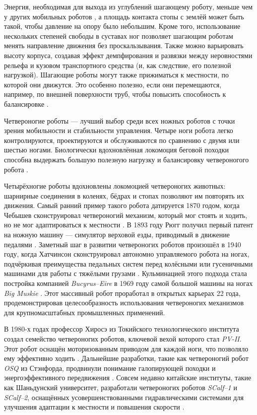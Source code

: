 Энергия, необходимая для выхода из углублений шагающему роботу, меньше чем у других мобильных роботов \cite{Bekker1962, bekker1969}, а площадь контакта стопы с землёй может быть такой, чтобы давление на опору было небольшим. Кроме того, использование нескольких степеней свободы в суставах ног позволяет шагающим роботам менять направление движения без проскальзывания. Также можно варьировать высоту корпуса, создавая эффект демпфирования и развязки между неровностями рельефа и кузовом транспортного средства (и, как следствие, его полезной нагрузкой). Шагающие роботы могут также прижиматься к местности, по которой они движутся. Это особенно полезно, если они перемещаются, например, по внешней поверхности труб, чтобы повысить способность к балансировке \cite{Kaneko2002}.

Четвероногие роботы --- лучший выбор среди всех ножных роботов с точки зрения мобильности и стабильности управления. Четыре ноги робота легко контролируются, проектируются и обслуживаются по сравнению с двумя или шестью ногами. Биологически вдохновлённая локомоция беговой походки способна выдержать большую полезную нагрузку и балансировку четвероногого робота \cite{gonccalves2013}.

Четырёхногие роботы вдохновлены локомоцией четвероногих животных: шарнирные соединения в коленях, бёдрах и стопах позволяют им повторять их движения. Самый ранний пример такого робота датируется 1870 годом, когда Чебышев сконструировал четвероногий механизм, который мог стоять и ходить, но не мог адаптироваться к местности \cite{Cheb1948}. В 1893 году Рюгг получил первый патент на ножную машину --- симулятор верховой езды, приводимый в движение педалями \cite{patent}. Заметный шаг в развитии четвероногих роботов произошёл в 1940 году, когда Хатчинсон сконструировал автономно управляемого робота на ногах, подчёркивая преимущества педальных систем перед колёсными или гусеничными машинами для работы с тяжёлыми грузами \cite{Hutchinson1967}.  Кульминацией этого подхода стала постройка компанией \textit{Bucyrus--Eire} в 1969 году самой большой машины на ногах \textit{Big Muskie} \cite{haddock2001extreme}. Этот массивный робот проработал в открытых карьерах 22 года, продемонстрировав целесообразность использования четвероногих механизмов для крупномасштабных промышленных применений.

В 1980-х годах профессор Хиросэ из Токийского технологического института создал семейство четвероногих роботов, ключевой вехой которого стал \textit{PV-II}. Этот робот оснащён моторизованным приводом для каждой ноги, что позволяло ему эффективно ходить \cite{Hirose2009}. Дальнейшие разработки, такие как четвероногий робот \textit{OSQ} из Стэнфорда, продвинули понимание галопирующей походки и энергоэффективного передвижения \cite{Nichol2004}.  Совсем недавно китайские институты, такие как Шаньдунский университет, разработали четвероногих роботов \textit{SCalf--1} и \textit{SCalf--2}, оснащённых усовершенствованными гидравлическими системами для улучшения адаптации к местности и повышения скорости \cite{Rong2012}.

